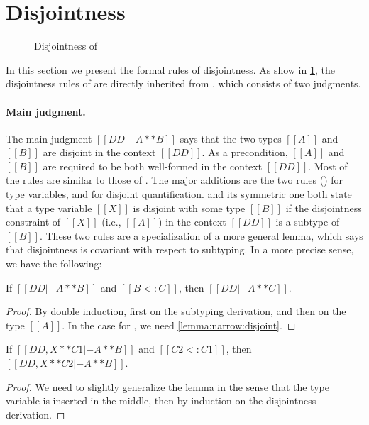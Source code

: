 
\section{Disjointness}
\label{sec:disjoint:fi}


\begin{figure}[t]
  \centering
  \caption{Disjointness of \fnamee}
  \label{fig:disjoint:fi}
\end{figure}


In this section we present the formal rules of disjointness. As show in
\cref{fig:disjoint:fi}, the disjointness rules of \fnamee are directly inherited
from \fname, which consists of two judgments.


\paragraph{Main judgment.}

The main judgment $[[DD |- A ** B]]$ says that the two types $[[A]]$ and $[[B]]$
are disjoint in the context $[[DD]]$. As a precondition, $[[A]]$
and $[[B]]$ are required to be both well-formed in the context $[[DD]]$.
Most of the rules are similar to those of
\namee. The major additions are the two rules () for
type variables, and  for disjoint quantification.
 and its symmetric one  both state that a type
variable $[[X]]$ is disjoint with some type $[[B]]$ if the
disjointness constraint of $[[X]]$ (i.e., $[[A]]$) in the context $[[DD]]$ is a subtype of
$[[B]]$. These two rules are a specialization of a more general lemma, which
says that disjointness is covariant with respect to subtyping. In a more precise
sense, we have the following:

\begin{lemma} \label{lemma:covariance:disjoint}
  If $[[DD |- A ** B]]$ and $[[B <: C]]$, then $[[DD |- A ** C]]$.
\end{lemma}
\begin{proof}
  By double induction, first on the subtyping derivation, and then on the
  type $[[A]]$. In the case for , we need \cref{lemma:narrow:disjoint}.
\end{proof}

\begin{lemma} \label{lemma:narrow:disjoint}
  If $[[DD, X ** C1 |- A ** B]]$ and $[[C2 <: C1]]$, then $[[DD, X ** C2 |- A ** B]]$.
\end{lemma}
\begin{proof}
  We need to slightly generalize the lemma in the sense that the type variable is inserted
  in the middle, then by induction on the disjointness derivation.
\end{proof}

